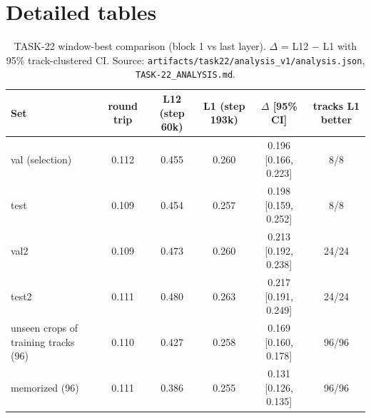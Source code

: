 \documentclass[10pt,letterpaper]{article}
\newcommand{\src}[1]{\nolinkurl{#1}}
\begin{document}
\appendix
\section{Detailed tables}
\label{app:tables}

\begin{table}[h]
\centering\footnotesize
\caption{TASK-22 window-best comparison (block 1 vs last layer). $\Delta$ = L12 $-$ L1 with 95\% track-clustered CI. Source: \src{artifacts/task22/analysis_v1/analysis.json}, \texttt{TASK-22\_ANALYSIS.md}.}
\begin{tabular}{@{}lccccc@{}}
\toprule
Set & round trip & L12 (step 60k) & L1 (step 193k) & $\Delta$ [95\% CI] & tracks L1 better\\
\midrule
val (selection) & 0.112 & 0.455 & 0.260 & 0.196 [0.166, 0.223] & 8/8\\
test & 0.109 & 0.454 & 0.257 & 0.198 [0.159, 0.252] & 8/8\\
val2 & 0.109 & 0.473 & 0.260 & 0.213 [0.192, 0.238] & 24/24\\
test2 & 0.111 & 0.480 & 0.263 & 0.217 [0.191, 0.249] & 24/24\\
unseen crops of training tracks (96) & 0.110 & 0.427 & 0.258 & 0.169 [0.160, 0.178] & 96/96\\
memorized (96) & 0.111 & 0.386 & 0.255 & 0.131 [0.126, 0.135] & 96/96\\
\bottomrule
\end{tabular}
\end{table}
\end{document}
